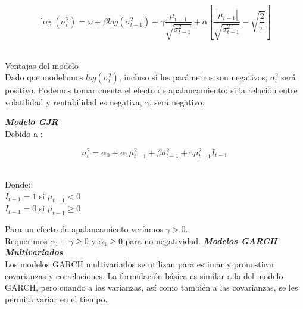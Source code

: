 		\begin{equation}
		\log(\sigma^2_t) = \omega + \beta log(\sigma^2_{t-1}) + \gamma \frac{\mu_{t-1}}{\sqrt{\sigma^2_{t-1}}} + \alpha \left[ \frac{|\mu_{t-1}|}{\sqrt{\sigma^2_{t-1}}} - \sqrt{\frac{2}{\pi}} \right]
		\end{equation} 
		\vspace{2mm}	
		
		Ventajas del modelo\\
		Dado que modelamos $log(\sigma^2_t)$, incluso si los par\'ametros son negativos, $\sigma^2_t$ ser\'a positivo.
		Podemos tomar cuenta el efecto de apalancamiento: si la relaci\'on entre volatilidad y rentabilidad es negativa, $\gamma$, ser\'a negativo.
		

\textit{\textbf{Modelo GJR}}\\
	Debido a \cite{glosten1993relation}:
	
	\begin{equation}
	\sigma^2_t = \alpha_0 + \alpha_1 \mu^2_{t-1} + \beta \sigma^2_{t-1} + \gamma \mu^2_{t-1} I_{t-1}
	\end{equation} 
	\vspace{2mm}	
	
	Donde:\\ 
	$I_{t-1}=1$ si $\mu_{t-1} < 0$\\
	$I_{t-1}=0$ si $\mu_{t-1} \geq 0$\\
	\vspace{2mm}	
	
	Para un efecto de apalancamiento ver\'{i}amos $\gamma > 0$.\\
	Requerimos $\alpha_1 + \gamma \geq 0$ y $\alpha_1 \geq 0$ para no-negatividad. 
	\vspace{2mm}	
\textit{\textbf{Modelos GARCH Multivariados}}\\
	Los modelos GARCH multivariados se utilizan para estimar y pronosticar covarianzas y correlaciones. La formulaci\'on b\'asica es similar a la del modelo GARCH, pero cuando a las varianzas, as\'{i} como tambi\'en a las covarianzas, se les permita variar en el tiempo.\\
	\vspace{2mm}	
	
